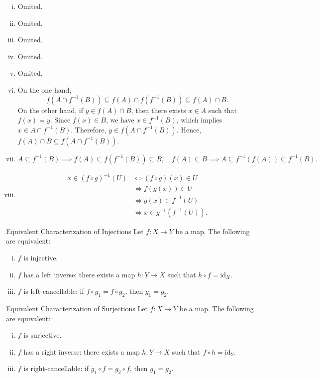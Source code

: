 \begin{prf}
    \begin{enumerate}[(i)]
        \item Omited.
        \item Omited.
        \item Omited.
        \item Omited.
        \item Omited.
        \item On the one hand, 
        \[
        f\left(A\cap f^{-1}(B)\right)\subseteq f(A)\cap f\left(f^{-1}(B)\right)\subseteq f(A)\cap B.
        \]
        On the other hand, if $y\in f(A)\cap B$, then there exists $x\in A$ such that $f(x)=y$. Since $f(x)\in B$, we have $x\in f^{-1}(B)$, which implies $x\in A\cap f^{-1}(B)$. Therefore, $y\in f\left(A\cap f^{-1}(B)\right)$. Hence, $f(A)\cap B\subseteq f\left(A\cap f^{-1}(B)\right)$.
        \item  
        \[
        A \subseteq f^{-1}(B) \implies f(A) \subseteq f(f^{-1}(B)) \subseteq B, \quad f(A) \subseteq B \implies A \subseteq f^{-1}(f(A)) \subseteq f^{-1}(B).
        \]
        \item 
        \begin{align*}
            x \in (f \circ g)^{-1}(U) &\iff (f \circ g)(x) \in U \\
            &\iff f(g(x)) \in U \\
            &\iff g(x) \in f^{-1}(U) \\
            &\iff x \in g^{-1}(f^{-1}(U)).
        \end{align*}
    \end{enumerate}
\end{prf}

\begin{proposition}{Equivalent Characterization of Injections}{}
    Let $f:X\to Y$ be a map. The following are equivalent:
    \begin{enumerate}[(i)]
        \item $f$ is injective.
        \item $f$ has a left inverse: there exists a map $h:Y\to X$ such that $h\circ f=\mathrm{id}_X$.
        \item $f$ is left-cancellable: if $f\circ g_1=f\circ g_2$, then $g_1=g_2$.
    \end{enumerate}
\end{proposition}

\begin{proposition}{Equivalent Characterization of Surjections}{}
    Let $f:X\to Y$ be a map. The following are equivalent:
    \begin{enumerate}[(i)]
        \item $f$ is surjective.
        \item $f$ has a right inverse: there exists a map $h:Y\to X$ such that $f\circ h=\mathrm{id}_Y$.
        \item $f$ is right-cancellable: if $g_1\circ f=g_2\circ f$, then $g_1=g_2$.
    \end{enumerate}
\end{proposition}


